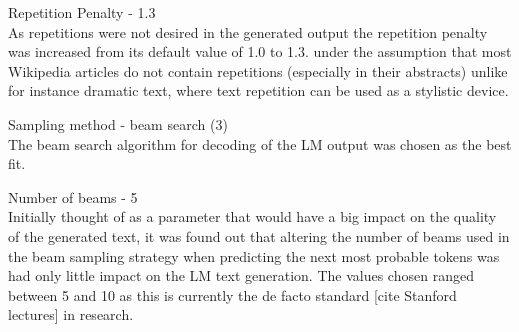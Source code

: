 Repetition Penalty - 1.3 \\
As repetitions were not desired in the generated output the repetition penalty was increased from its default value of 1.0 to 1.3. under the assumption that most Wikipedia articles do not contain repetitions (especially in their abstracts) unlike for instance dramatic text, where text repetition can be used as a stylistic device.

Sampling method - beam search (3) \\
The beam search algorithm for decoding of the LM output was chosen as the best fit.

Number of beams - 5 \\
Initially thought of as a parameter that would have a big impact on the quality of the generated text, it was found out that altering the number 
of beams used in the beam sampling strategy when predicting the next most probable tokens was had only little impact on the LM text generation. 
The values chosen ranged between 5 and 10 as this is currently the de facto standard [cite Stanford lectures] in research.
